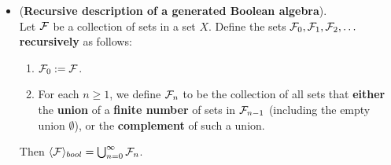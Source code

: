 \documentclass[11pt]{article}
\begin{document}
\begin{itemize}
\begin{example}
\begin{itemize}
\item \begin{proposition} (\textbf{Recursive description of a generated Boolean algebra}). \citep{tao2011introduction} \\
Let ${\mathcal F}$ be a collection of sets in a set $X$. Define the sets ${\mathcal F}_0, {\mathcal F}_1, {\mathcal F}_2, \ldots$ \textbf{recursively} as follows:
\begin{enumerate}
\item ${\mathcal F}_0  := {\mathcal F}$.
\item For each $n \ge 1$, we define ${\mathcal F}_n$ to be the collection of all sets that \textbf{either} the \textbf{union} of a \textbf{finite number} of sets in ${\mathcal F}_{n-1}$
(including the empty union $\emptyset$), or the \textbf{complement} of such a union.
\end{enumerate}
Then $\langle {\mathcal F} \rangle_{bool} =  \bigcup_{n=0}^{\infty}{\mathcal F}_{n}$.
\end{proposition}
\end{itemize}
\end{example}
\end{itemize}
\end{document}
